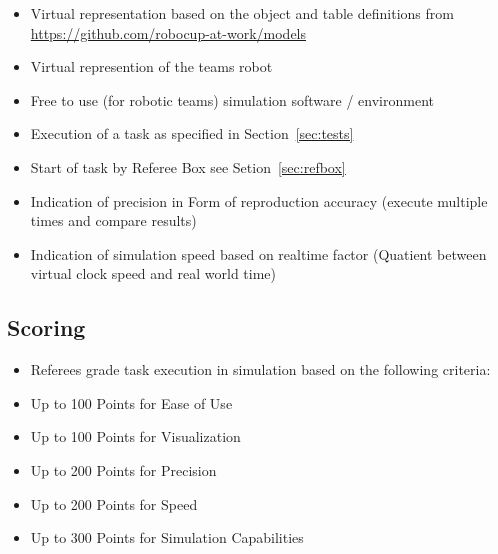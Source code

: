 \begin{itemize}
  \item Virtual representation based on the object and table definitions from \url{https://github.com/robocup-at-work/models}
  \item Virtual represention of the teams robot
  \item Free to use (for robotic teams) simulation software / environment
  \item Execution of a task as specified in Section~\ref{sec:tests}
  \item Start of task by Referee Box see Setion~\ref{sec:refbox}
  \item Indication of precision in Form of reproduction accuracy (execute multiple times and compare results)
  \item Indication of simulation speed based on realtime factor (Quatient between virtual clock speed and real world time)
\end{itemize}

\subsection{Scoring}

\begin{itemize}
  \item Referees grade task execution in simulation based on the following criteria:
  \item Up to 100 Points for Ease of Use
  \item Up to 100 Points for Visualization
  \item Up to 200 Points for Precision
  \item Up to 200 Points for Speed
  \item Up to 300 Points for Simulation Capabilities
\end{itemize}


